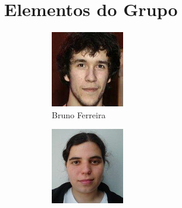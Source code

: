 \documentclass[11pt, a4paper, oneside]{article}
\begin{document}
\section{Elementos do Grupo}
\begin{figure}[h!]
\centering
\begin{subfigure}{.33\textwidth}
  \centering
  \includegraphics[width=0.8\linewidth]{60}
  \caption{Bruno Ferreira  }
\end{subfigure}%
\begin{subfigure}{.33\textwidth}
  \centering
  \includegraphics[width=0.8\linewidth]{107}

\end{subfigure}
\end{figure}
\end{document}
